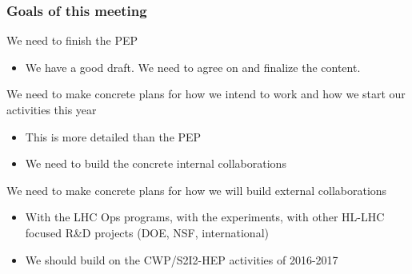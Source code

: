 \begin{frame}
\frametitle{Goals of this meeting}

We need to finish the PEP \\
\begin{itemize}
\item We have a good draft. We need to agree on and finalize the content.
\end{itemize}
\vskip 0.15in

We need to make concrete plans for how we intend to work and how we start our activities this
year
\begin{itemize}
\item This is more detailed than the PEP
\item We need to build the concrete internal collaborations 
\end{itemize}
\vskip 0.15in

We need to make concrete plans for how we will build external collaborations

\begin{itemize}
\item With the LHC Ops programs, with the experiments, with other HL-LHC focused R\&D projects (DOE, NSF, international)
\item We should build on the CWP/S2I2-HEP activities of 2016-2017
\end{itemize}
\vskip 0.15in




\end{frame}


